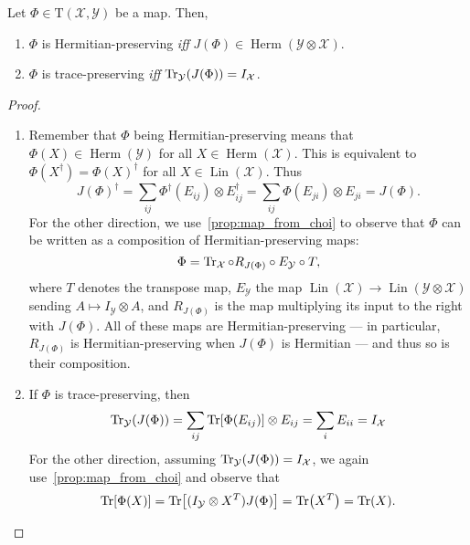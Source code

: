 \documentclass[12pt]{report}
\newcommand{\calY}{{\mathcal{Y}}}
\newcommand{\calX}{{\mathcal{X}}}
\newcommand{\rmT}{{\mathrm{T}}}
\DeclareMathOperator{\Herm}{Herm}
\DeclareMathOperator{\Lin}{Lin}
\begin{document}
\begin{prop}
	Let $\Phi\in\rmT(\calX,\calY)$ be a map. Then,
	\begin{enumerate}
		\item $\Phi$ is Hermitian-preserving \emph{iff} $J(\Phi)\in\Herm(\calY\otimes\calX)$.
		\item $\Phi$ is trace-preserving \emph{iff}
	$\Tr_\calY(J(\Phi)) = I_{\calX}$.
	\end{enumerate}
\end{prop}
\begin{proof}$\,$
	\begin{enumerate}
		\item Remember that $\Phi$ being Hermitian-preserving means that $\Phi(X)\in\Herm(\calY)$ for all $X\in\Herm(\calX)$.
		This is equivalent to $\Phi(X^\dagger)=\Phi(X)^\dagger$ for all $X\in\Lin(\calX)$. Thus
		\begin{equation}
			J(\Phi)^\dagger =
			\sum_{ij} \Phi^\dagger(E_{ij})\otimes E_{ij}^\dagger
			= \sum_{ij} \Phi(E_{ji}) \otimes E_{ji}
			= J(\Phi).
		\end{equation}
		For the other direction, we use~\cref{prop:map_from_choi} to observe that $\Phi$ can be written as a composition of Hermitian-preserving maps:
		\begin{equation}
			\Phi = \Tr_\calX \circ R_{J(\Phi)} \circ E_\calY \circ T,
		\end{equation}
		where $T$ denotes the transpose map, $E_\calY$ the map $\Lin(\calX)\to\Lin(\calY\otimes\calX)$ sending $A\mapsto I_\calY\otimes A$, and $R_{J(\Phi)}$ is the map multiplying its input to the right with $J(\Phi)$. All of these maps are Hermitian-preserving --- in particular, $R_{J(\Phi)}$ is Hermitian-preserving when $J(\Phi)$ is Hermitian --- and thus so is their composition.
		\item If $\Phi$ is trace-preserving, then
		\begin{equation}
			\Tr_\calY(J(\Phi))
			= \sum_{ij} \Tr[\Phi(E_{ij})]\otimes E_{ij}
			= \sum_i E_{ii} = I_\calX
		\end{equation}
		For the other direction, assuming $\Tr_\calY(J(\Phi))=I_\calX$, we again use~\cref{prop:map_from_choi} and observe that
		\begin{equation}
			\Tr[\Phi(X)]
			= \Tr[(I_\calY\otimes X^T)J(\Phi)]
			= \Tr(X^T) = \Tr(X).
		\end{equation}
	\end{enumerate}
\end{proof}
\end{document}
